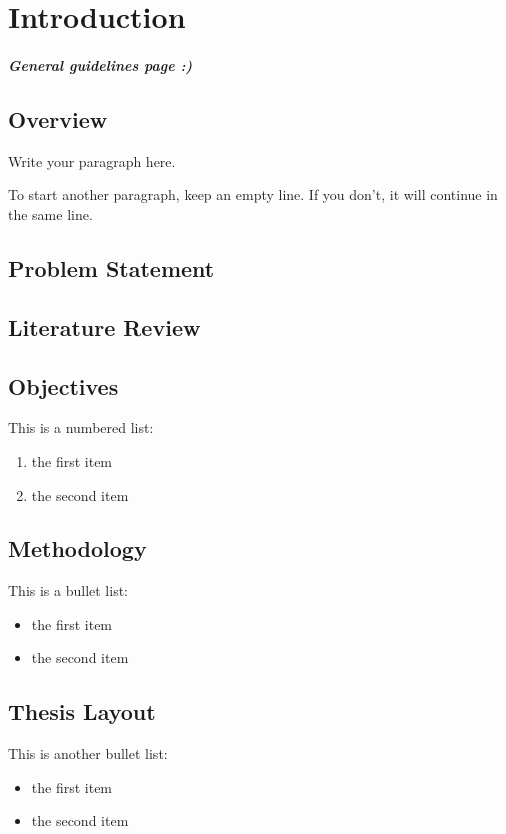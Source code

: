 \chapter{Introduction}
\vspace{2em}

\paragraph{General guidelines page :) }


\section{Overview}
Write your paragraph here.

To start another paragraph, keep an empty line.
If you don't, it will continue in the same line.

\section{Problem Statement}
\section{Literature Review}
\section{Objectives}

This is a numbered list:
\begin{enumerate}
    \item the first item
    \item the second item
\end{enumerate}

\section{Methodology}
This is a bullet list: 
\begin{itemize}
    \item the first item
    \item the second item
\end{itemize}

\section{Thesis Layout}

This is another bullet list: 
\begin{itemize}[label=-]
    \item the first item
    \item the second item
\end{itemize}
